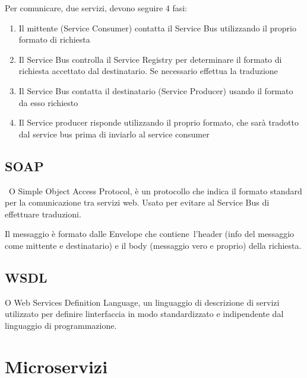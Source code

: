 \documentclass[
]{article}
\providecommand{\tightlist}{%
  \setlength{\itemsep}{0pt}\setlength{\parskip}{0pt}}
\begin{document}
{}

{Per comunicare, due servizi, devono seguire 4 fasi:}

\begin{enumerate}
\tightlist
\item
  {Il mittente (Service Consumer) contatta il Service Bus utilizzando il
  proprio formato di richiesta}
\item
  {Il Service Bus controlla il Service Registry per determinare il
  formato di richiesta accettato dal destinatario. Se necessario
  effettua la traduzione}
\item
  {Il Service Bus contatta il destinatario (Service Producer) usando il
  formato da esso richiesto}
\item
  {Il Service producer risponde utilizzando il proprio formato, che sarà
  tradotto dal service bus prima di inviarlo al service consumer}
\end{enumerate}

{}

\subsection{\texorpdfstring{{SOAP}}{SOAP}}\label{h.jmhnvydlh3yl}

{~O Simple Object Access Protocol, è un protocollo che indica il formato
standard per la comunicazione tra servizi web. Usato per evitare al
Service Bus di effettuare traduzioni.}

{}

{Il messaggio è formato dalle Envelope che }{contiene}{~l'header (info
del messaggio come mittente e destinatario) e il body (messaggio vero e
proprio) della richiesta.}

{}

\subsection{\texorpdfstring{{WSDL}}{WSDL}}\label{h.l4dtyg6mts0a}

{O Web Services Definition Language, un linguaggio di descrizione di
servizi utilizzato per definire l\textquotesingle interfaccia in modo
standardizzato e indipendente dal linguaggio di programmazione.}

{}

\section{\texorpdfstring{{Microservizi}}{Microservizi}}\label{h.bpjx6fssz0mt}
\end{document}
